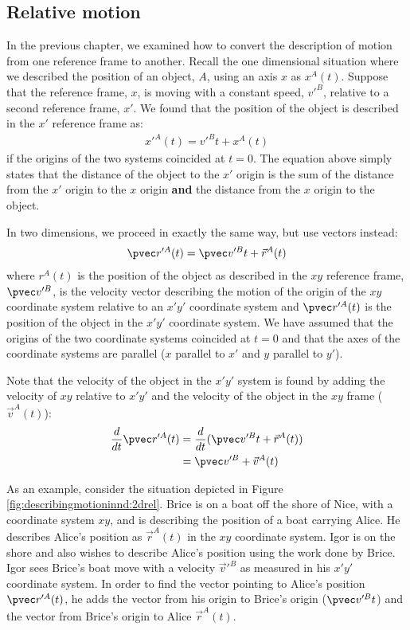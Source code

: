 \subsection{Relative motion}
In the previous chapter, we examined how to convert the description of motion from one reference frame to another. Recall the one dimensional situation where we described the position of an object, $A$, using an axis $x$ as $x^A(t)$. Suppose that the reference frame, $x$, is moving with a constant speed, $v'^B$, relative to a second reference frame, $x'$. We found that the position of the object is described in the $x'$ reference frame as:
\begin{align*}
x'^A(t)=v'^Bt+x^A(t)
\end{align*}
if the origins of the two systems coincided at $t=0$. The equation above simply states that the distance of the object to the $x'$ origin is the sum of the distance from the $x'$ origin to the $x$ origin \textbf{and} the distance from the $x$ origin to the object.

In two dimensions, we proceed in exactly the same way, but use vectors instead:
\begin{align*}
\pvec r'^A(t) = \pvec v'^Bt+\vec r^A(t)
\end{align*}
where $r^A(t)$ is the position of the object as described in the $xy$ reference frame, $\pvec v'^B$, is the velocity vector describing the motion of the origin of the $xy$ coordinate system relative to an $x'y'$ coordinate system and $\pvec r'^A(t)$ is the position of the object in the $x'y'$ coordinate system. We have assumed that the origins of the two coordinate systems coincided at $t=0$ and that the axes of the coordinate systems are parallel ($x$ parallel to $x'$ and $y$ parallel to $y'$).

Note that the velocity of the object in the $x'y'$ system is found by adding the velocity of $xy$ relative to $x'y'$ and the velocity of the object in the $xy$ frame ($\vec v^A(t)$):
\begin{align*}
\frac{d}{dt}\pvec r'^A(t) &=\frac{d}{dt}(\pvec v'^Bt+\vec r^A(t))\\
&=\pvec v'^B+\vec v^A(t)
\end{align*}

As an example, consider the situation depicted in Figure \ref{fig:describingmotioninnd:2drel}. Brice is on a boat off the shore of Nice, with a coordinate system $xy$, and is describing the position of a boat carrying Alice. He describes Alice's position as $\vec r^A(t)$ in the $xy$ coordinate system. Igor is on the shore and also wishes to describe Alice's position using the work done by Brice. Igor sees Brice's boat move with a velocity $\vec v'^B$ as measured in his $x'y'$ coordinate system. In order to find the vector pointing to Alice's position $\pvec r'^A(t)$, he adds the vector from his origin to Brice's origin ($\pvec v'^B t$) and the vector from Brice's origin to Alice $\vec r^A(t)$.

